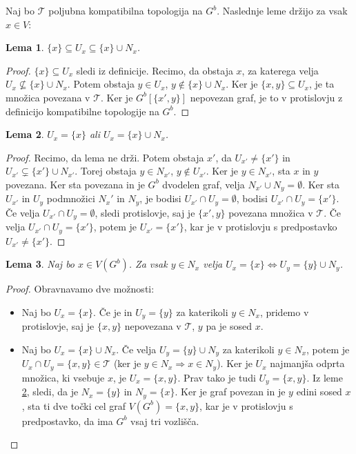 \documentclass[a4paper, 12pt]{book}
\newtheorem{lemma}{Lema}[section]
\theoremstyle{definition}
\theoremstyle{remark}
\begin{document}
Naj bo $\mathcal{T}$ poljubna kompatibilna topologija na $G^b$. Naslednje leme držijo za vsak $x \in V$:
\begin{lemma}\label{lem1}
  $\{x\} \subseteq U_x \subseteq \{x\} \cup N_x$.
\end{lemma}
\begin{proof}
  $\{x\} \subseteq U_x$ sledi iz definicije. Recimo, da obstaja $x$, za katerega velja
  $U_{x} \nsubseteq \{x\} \cup N_{x}$. Potem obstaja
  $y \in U_{x}$, $y \notin \{x\} \cup N_{x}$. Ker je $\{x, y\} \subseteq U_x$,
  je ta množica povezana v $\mathcal{T}$. Ker je $G^b[\{x',y\}]$ nepovezan graf, je to v
  protislovju z definicijo kompatibilne topologije na $G^b$.
\end{proof}
\begin{lemma}\label{lem2}
  $U_x = \{x\}$ ali $U_x = \{x\} \cup N_x$.
\end{lemma}
\begin{proof}
  Recimo, da lema ne drži. Potem obstaja $x'$, da $U_{x'} \neq \{x'\}$ in
  $U_{x'} \subsetneq \{x'\} \cup N_{x'}$. Torej obstaja $y \in N_{x'}$, $y \notin U_{x'}$.
  Ker je $y \in N_{x'}$, sta $x$ in $y$ povezana. Ker sta povezana in je $G^b$
  dvodelen graf, velja $N_{x'} \cup N_y = \emptyset$. Ker sta $U_{x'}$ in $U_y$ 
  podmnožici $N_x'$ in $N_y$, je bodisi $U_{x'} \cap U_y = \emptyset$,
  bodisi $U_{x'} \cap U_y = \{x'\}$. Če velja $U_{x'} \cap U_y = \emptyset$, sledi
  protislovje, saj je $\{x',y\}$ povezana množica v $\mathcal{T}$.
  Če velja $U_{x'} \cap U_y = \{x'\}$, potem je $U_{x'} = \{x'\}$, kar je v
  protislovju s predpostavko $U_{x'} \neq \{x'\}$.
\end{proof}
\begin{lemma}\label{lem3}
  Naj bo $x \in V(G^b)$. Za vsak $y \in N_x$ velja $U_x = \{x\} \iff U_y = \{y\} \cup N_y$.
\end{lemma}
\begin{proof}
  Obravnavamo dve možnosti:
  \begin{itemize}
    \item[(1)] Naj bo $U_x = \{x\}$. Če je in $U_y = \{y\}$ za katerikoli $y \in N_x$, pridemo v protislovje, saj je 
    $\{x,y\}$ nepovezana v $\mathcal{T}$, $y$ pa je sosed $x$.
    \item[(2)] Naj bo $U_x = \{x\} \cup N_x$. Če velja $U_y = \{y\} \cup N_y$ za katerikoli $y \in N_x$, potem je
    $U_x \cap U_y = \{x, y\} \in \mathcal{T}$ (ker je $y \in N_x \Rightarrow x \in N_y$). Ker je
    $U_x$ najmanjša odprta množica, ki vsebuje $x$, je $U_x = \{x,y\}$. Prav tako je
    tudi $U_y = \{x,y\}$. Iz leme \ref*{lem2}, sledi, da je $N_x = \{y\}$ in $N_y = \{x\}$.
    Ker je graf povezan in je $y$ edini sosed $x$, sta ti dve točki cel graf
    $V(G^b) = \{x,y\}$, kar je v protislovju s predpostavko, da ima $G^b$ vsaj tri vozlišča.
  \end{itemize}
\end{proof}
\end{document}
